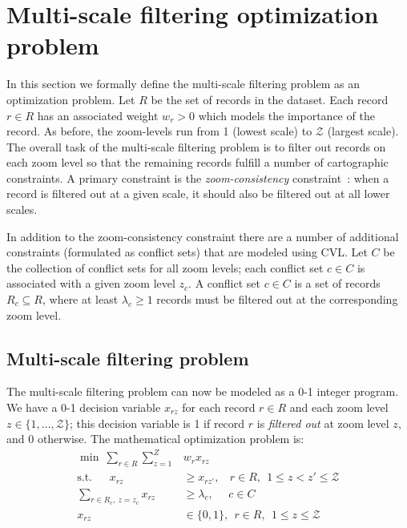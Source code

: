 \section{Multi-scale filtering optimization problem}
\label{sec:optimizationmodel}

In this section we formally define the multi-scale filtering problem as an optimization problem. Let $R$ be the set of records in the dataset. Each record $r \in R$ has an associated weight $w_r > 0$ which models the importance of the record. As before, the zoom-levels run from 1 (lowest scale) to $\mathcal{Z}$ (largest scale). The overall task of the multi-scale filtering problem is to filter out records on each zoom level so that the remaining records fulfill a number of cartographic constraints. A primary constraint is the \emph{zoom-consistency} constraint~\cite{sarma2012fusiontables}: when a record is filtered out at a given scale, it should also be filtered out at all lower scales. 

In addition to the zoom-consistency constraint there are a number of additional constraints (formulated as conflict sets) that are modeled using CVL. Let $C$ be the collection of conflict sets for all zoom levels; each conflict set $c \in C$ is associated with a given zoom level $z_c$. A conflict set $c \in C$ is a set of records $R_c \subseteq R$, where at least $\lambda_c \geq 1$ records must be filtered out at the corresponding zoom level. 



\subsection{Multi-scale filtering problem}

The multi-scale filtering problem can now be modeled as a 0-1 integer program. We have a 0-1 decision variable $x_{rz}$ for each record $r \in R$ and each zoom level $z \in \{1,\ldots, \mathcal{Z}\}$; this decision variable is 1 if record $r$ is \emph{filtered out} at zoom level $z$, and 0 otherwise. The mathematical optimization problem is:
\begin{align}
  \label{eq:objective}
  \min ~\sum_{r \in R} \sum_{z=1}^Z &w_r x_{rz} \\
  \label{eq:zoom-consistency}
  \mbox{s.t.}~~~~~~~x_{rz} &\geq x_{rz'}, ~~~~r \in R, ~~1 \leq z < z' \leq \mathcal{Z} \\
  \label{eq:general-constraints}
  \sum_{r \in R_c, ~z = z_c} x_{rz} &\geq \lambda_c, ~~~~~~ c \in C \\
  x_{rz} & \in \{0, 1\}, ~~ r \in R, ~~1 \leq z \leq \mathcal{Z}
\end{align}

